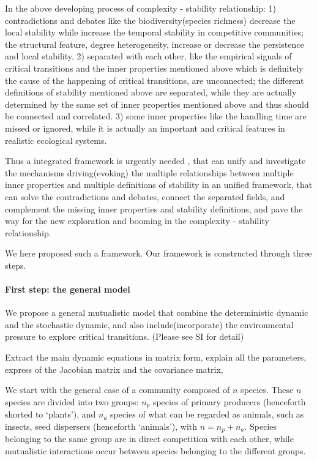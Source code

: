 \documentclass[a4paper,fleqn,12pt]{article}
\begin{document}
In the above developing process of complexity - stability relationship:
1) contradictions and debates like the biodiversity(species richness) decrease the local stability while increase the temporal stability in competitive communities;
the structural feature, degree heterogeneity, increase or decrease the persistence and local stability.
2) separated with each other, like the empirical signals of critical transitions and the inner properties mentioned above which is definitely the cause of the happening of critical transitions, are unconnected;
the different definitions of stability mentioned above are separated, while they are actually determined by the same set of inner properties mentioned above and thus should be connected and correlated.
3) some inner properties like the handling time are missed or ignored, while it is actually an important and critical features in realistic ecological systems.

Thus a integrated framework is urgently needed \cite{ives_stability_2007,scheffer_anticipating_2012}, that can unify and investigate the mechanisms driving(evoking) the multiple relationships between multiple inner properties and multiple definitions of stability in an unified framework,
that can solve the contradictions and debates, connect the separated fields, and complement the missing inner properties and stability definitions,
and pave the way for the new exploration and booming in the complexity - stability relationship.

We here proposed such a framework.
Our framework is constructed through three steps.

\paragraph*{First step: the general model} We propose a general mutualistic model that combine the deterministic dynamic and the stochastic dynamic, and also include(incorporate) the environmental pressure to explore critical transitions.
(Please see SI for detail)

{\color{red}Extract the main dynamic equations in matrix form, explain all the parameters, express of the Jacobian matrix and the covariance matrix, }

We start with the general case of a community composed of $n$ species.
These $n$ species are divided into two groups: $n_p$ species of primary producers (henceforth shorted to `plants'), and $n_a$ species of what can be regarded as animals, such as insects, seed dispersers (henceforth `animals'), with $n = n_p + n_a$.
Species belonging to the same group are in direct competition with each other, while mutualistic interactions occur between species belonging to the different groups.
\end{document}
